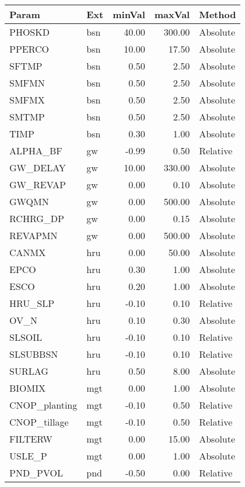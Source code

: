 \begin{table}[ht]
\centering
\begin{tabular}{llrrl}
  \hline
Param & Ext & minVal & maxVal & Method \\ 
  \hline
PHOSKD & bsn & 40.00 & 300.00 & Absolute \\ 
  PPERCO & bsn & 10.00 & 17.50 & Absolute \\ 
  SFTMP & bsn & 0.50 & 2.50 & Absolute \\ 
  SMFMN & bsn & 0.50 & 2.50 & Absolute \\ 
  SMFMX & bsn & 0.50 & 2.50 & Absolute \\ 
  SMTMP & bsn & 0.50 & 2.50 & Absolute \\ 
  TIMP & bsn & 0.30 & 1.00 & Absolute \\ 
  ALPHA\_BF & gw & -0.99 & 0.50 & Relative \\ 
  GW\_DELAY & gw & 10.00 & 330.00 & Absolute \\ 
  GW\_REVAP & gw & 0.00 & 0.10 & Absolute \\ 
  GWQMN & gw & 0.00 & 500.00 & Absolute \\ 
  RCHRG\_DP & gw & 0.00 & 0.15 & Absolute \\ 
  REVAPMN & gw & 0.00 & 500.00 & Absolute \\ 
  CANMX & hru & 0.00 & 50.00 & Absolute \\ 
  EPCO & hru & 0.30 & 1.00 & Absolute \\ 
  ESCO & hru & 0.20 & 1.00 & Absolute \\ 
  HRU\_SLP & hru & -0.10 & 0.10 & Relative \\ 
  OV\_N & hru & 0.10 & 0.30 & Absolute \\ 
  SLSOIL & hru & -0.10 & 0.10 & Relative \\ 
  SLSUBBSN & hru & -0.10 & 0.10 & Relative \\ 
  SURLAG & hru & 0.50 & 8.00 & Absolute \\ 
  BIOMIX & mgt & 0.00 & 1.00 & Absolute \\ 
  CNOP\_planting & mgt & -0.10 & 0.50 & Relative \\ 
  CNOP\_tillage & mgt & -0.10 & 0.50 & Relative \\ 
  FILTERW & mgt & 0.00 & 15.00 & Absolute \\ 
  USLE\_P & mgt & 0.00 & 1.00 & Absolute \\ 
  PND\_PVOL & pnd & -0.50 & 0.00 & Relative \\ 

\end{tabular}
\end{table}

